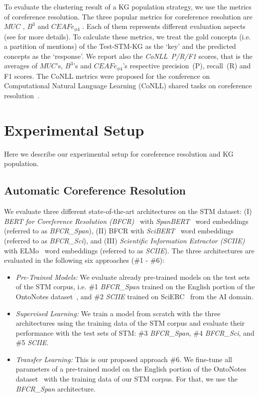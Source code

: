 \documentclass[runningheads]{llncs}
\begin{document}
To evaluate the clustering result of a KG population strategy, we use the metrics of coreference resolution.
The three popular metrics for coreference resolution are $MUC$ \cite{VilainBACH95MUC}, $B^3$ \cite{Bagga98B3} and $CEAFe_{\phi 4}$ \cite{Luo05CEAF}. Each of them represents different evaluation aspects (see \cite{Pradhan2014Scoring} for more details). 
To calculate these metrics, we treat the gold concepts (i.e. a partition of mentions) of the Test-STM-KG as the `key' and the predicted concepts as the `response'.
We report also the \emph{CoNLL~P/R/F1} scores, that is the averages of $MUC$'s, $B^3$'s and $CEAFe_{\phi 4}$'s respective precision~(P), recall~(R) and F1 scores. The CoNLL metrics were proposed for the conference on Computational Natural Language Learning (CoNLL) shared tasks on coreference resolution~\cite{Pradhan2014Scoring}.




\section{Experimental Setup}
Here we describe our experimental setup for coreference resolution and KG population.

\subsection{Automatic Coreference Resolution}

We evaluate three different state-of-the-art architectures on the STM dataset:
(I) \emph{BERT for Coreference Resolution (BFCR)}~\cite{Joshi2020BFCR} with \emph{SpanBERT}~\cite{Joshi2020SpanBERT} word embeddings (referred to as \emph{BFCR\_Span}), (II) BFCR with \emph{SciBERT}~\cite{Beltagy2019SciBERTPC} word embeddings (referred to as \emph{BFCR\_Sci}), and (III) \emph{Scientific Information Extractor (SCIIE)}~\cite{Luan2018MultiTaskIO} with ELMo~\cite{Peters2018ELMo} word embeddings (referred to as \emph{SCIIE}).
The three architectures are evaluated in the following six approaches (\#1 - \#6):
\begin{itemize}[nosep] 
    \item \emph{Pre-Trained Models:}
We evaluate already pre-trained models on the test sets of the STM corpus, i.e.
\#1 \emph{BFCR\_Span} trained on the English portion of the OntoNotes dataset~\cite{PradhanCoNLL2012}, and \#2 \emph{SCIIE} trained on SciERC~\cite{Luan2018MultiTaskIO} from the AI domain.    

    \item \emph{Supervised Learning:} 
We train a model from scratch with the three architectures using the training data of the STM corpus and evaluate their performance with the test sets of STM:
\#3 \emph{BFCR\_Span}, \#4 \emph{BFCR\_Sci}, and \#5  \emph{SCIIE}.    

    \item \emph{Transfer Learning:} 
This is our proposed approach \#6.
We fine-tune all parameters of a pre-trained model on the English portion of the OntoNotes dataset~\cite{Joshi2020SpanBERT} with the training data of our STM corpus.
For that, we use the \emph{BFCR\_Span} architecture.    
\end{itemize}
\end{document}
